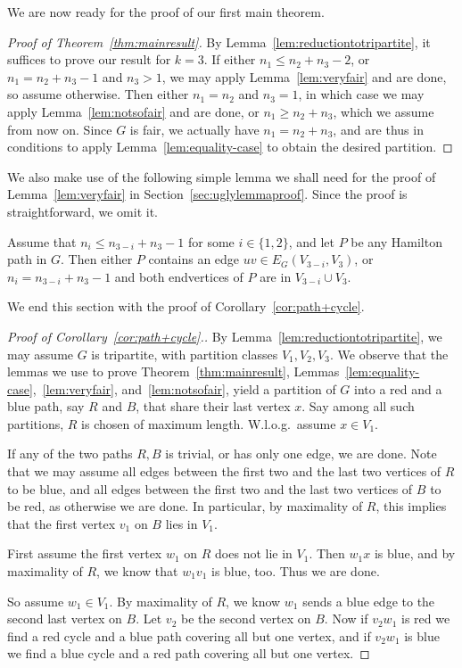\documentclass[a4paper,10pt]{article}
\begin{document}
\medskip

We are now ready for the proof of our first main theorem.

\begin{proof}[Proof of Theorem~\ref{thm:mainresult}]
By Lemma~\ref{lem:reductiontotripartite}, it suffices to prove our result for $k=3$. If either $n_1\leq n_2+n_3-2$, or $n_1=n_2+n_3-1$ and $n_3>1$, we may apply Lemma~\ref{lem:veryfair} and are done, so assume otherwise. Then either $n_1=n_2$ and $n_3=1$, in which case we may apply 
Lemma~\ref{lem:notsofair} and are done, or $n_1\geq n_2+n_3$, which we assume from now on. Since $G$ is fair, we actually have $n_1= n_2+n_3$, and are thus in conditions to apply Lemma~\ref{lem:equality-case} to obtain the desired partition.
\end{proof}

\medskip

We also make use of the following simple lemma we shall need for the proof of Lemma~\ref{lem:veryfair} in Section~\ref{sec:uglylemmaproof}.
Since the proof is straightforward, we omit it.

\begin{lemma}\label{lem:23edge-new}
Assume that $n_i \le n_{3-i} + n_3 - 1$ for some $i \in \{1,2\}$, and let $P$ be any Hamilton path in $G$.
Then either $P$ contains an edge $uv \in E_G(V_{3-i},V_3)$, or $n_i = n_{3-i} + n_3 - 1$ and both endvertices of $P$ are in $V_{3-i} \cup V_3$.
\end{lemma}

We end this section with the proof of Corollary~\ref{cor:path+cycle}.

\begin{proof}[Proof of Corollary~\ref{cor:path+cycle}.]
By Lemma~\ref{lem:reductiontotripartite}, we may assume $G$ is tripartite, with partition classes $V_1, V_2, V_3$.
We observe that the lemmas we use to prove Theorem~\ref{thm:mainresult}, Lemmas~\ref{lem:equality-case},~\ref{lem:veryfair}, and~\ref{lem:notsofair}, yield a partition of $G$ into a red and a blue path, say $R$ and $B$, that share their last vertex $x$.
Say among all such partitions, $R$ is chosen of maximum length. 
W.l.o.g.~assume $x\in V_1$.

If any of the two paths $R,B$ is trivial, or has only one edge, we are done. 
Note that we may assume all edges between the first two and  the last two vertices of $R$ to be blue, and all edges between the first two and the last two vertices of $B$ to be red, as otherwise we are done. 
In particular, by maximality of $R$, this implies that the first vertex $v_1$ on $B$ lies in $V_1$. 

First assume the first vertex $w_1$ on $R$  does not lie in $V_1$. 
Then $w_1x$ is blue, and by maximality of $R$, we know that $w_1v_1$ is blue, too. Thus we are done. 

So assume $w_1\in V_1$. 
By maximality of $R$, we know $w_1$ sends a blue edge to the second last vertex on $B$. 
Let $v_2$ be the second vertex on $B$.
Now if $v_2w_1$ is red we find a red cycle and a blue path covering all but one vertex, and if $v_2w_1$  is blue we find a blue cycle and a red path covering all but one vertex.
\end{proof}
\end{document}
